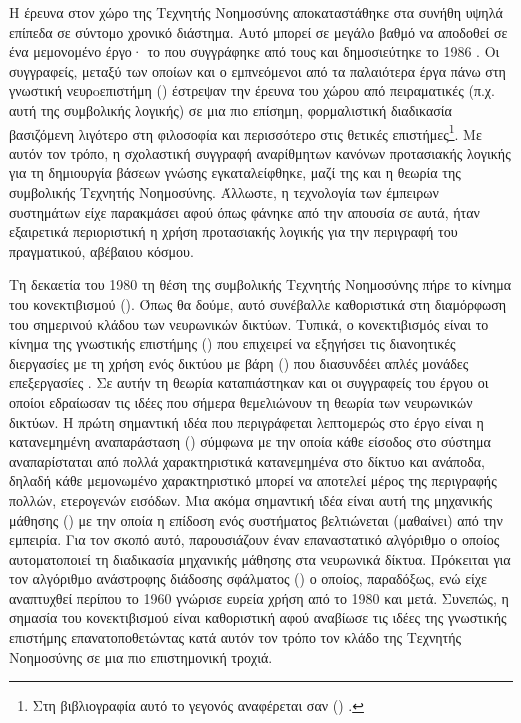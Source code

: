 Η έρευνα στον χώρο της Τεχνητής Νοημοσύνης αποκαταστάθηκε στα συνήθη υψηλά επίπεδα σε σύντομο χρονικό διάστημα. Αυτό μπορεί σε μεγάλο βαθμό να αποδοθεί σε ένα μεμονομένο έργο· το  που συγγράφηκε από τους  και δημοσιεύτηκε το 1986 \cite{rumelhart1988parallel}. Οι συγγραφείς, μεταξύ των οποίων και ο  εμπνεόμενοι από τα παλαιότερα έργα πάνω στη γνωστική νευρoεπιστήμη () έστρεψαν την έρευνα του χώρου από πειραματικές  (π.χ. αυτή της συμβολικής λογικής) σε μια πιο επίσημη, φορμαλιστική διαδικασία βασιζόμενη λιγότερο στη φιλοσοφία και περισσότερο στις θετικές επιστήμες\footnote{Στη βιβλιογραφία αυτό το γεγονός αναφέρεται σαν  () \cite{russell2020artificial}.}. Με αυτόν τον τρόπο, η σχολαστική συγγραφή αναρίθμητων κανόνων προτασιακής λογικής για τη δημιουργία βάσεων γνώσης εγκαταλείφθηκε, μαζί της και η θεωρία της συμβολικής Τεχνητής Νοημοσύνης. Άλλωστε, η τεχνολογία των έμπειρων συστημάτων είχε παρακμάσει αφού όπως φάνηκε από την απουσία  σε αυτά, ήταν εξαιρετικά περιοριστική η χρήση προτασιακής λογικής για την περιγραφή του πραγματικού, αβέβαιου κόσμου\cite{russell2020artificial, singh_2019}.
\par

Τη δεκαετία του 1980 τη θέση της συμβολικής Τεχνητής Νοημοσύνης πήρε το κίνημα του κονεκτιβισμού (). Όπως θα δούμε, αυτό συνέβαλλε καθοριστικά στη διαμόρφωση του σημερινού κλάδου των νευρωνικών δικτύων. Τυπικά, ο κονεκτιβισμός είναι το κίνημα της γνωστικής επιστήμης () που επιχειρεί να εξηγήσει τις διανοητικές διεργασίες με τη χρήση ενός δικτύου με βάρη () που διασυνδέει απλές μονάδες επεξεργασίες \cite{connectionism}. Σε αυτήν τη θεωρία καταπιάστηκαν και οι συγγραφείς του έργου  \cite{rumelhart1988parallel} οι οποίοι εδραίωσαν τις ιδέες που σήμερα θεμελιώνουν τη θεωρία των νευρωνικών δικτύων. Η πρώτη σημαντική ιδέα που περιγράφεται λεπτομερώς στο έργο είναι η κατανεμημένη αναπαράσταση () σύμφωνα με την οποία κάθε είσοδος στο σύστημα αναπαρίσταται από πολλά χαρακτηριστικά κατανεμημένα στο δίκτυο και ανάποδα, δηλαδή κάθε μεμονωμένο χαρακτηριστικό μπορεί να αποτελεί μέρος της περιγραφής πολλών, ετερογενών εισόδων. Μια ακόμα σημαντική ιδέα είναι αυτή της μηχανικής μάθησης () με την οποία η επίδοση ενός συστήματος βελτιώνεται (μαθαίνει) από την εμπειρία. Για τον σκοπό αυτό, παρουσιάζουν έναν επαναστατικό αλγόριθμο ο οποίος αυτοματοποιεί τη διαδικασία μηχανικής μάθησης στα νευρωνικά δίκτυα. Πρόκειται για τον αλγόριθμο ανάστροφης διάδοσης σφάλματος () ο οποίος, παραδόξως, ενώ είχε αναπτυχθεί περίπου το 1960 γνώρισε ευρεία χρήση από το 1980 και μετά. Συνεπώς, η σημασία του κονεκτιβισμού είναι καθοριστική αφού αναβίωσε τις ιδέες της γνωστικής επιστήμης επανατοποθετώντας κατά αυτόν τον τρόπο τον κλάδο της Τεχνητής Νοημοσύνης σε μια πιο επιστημονική τροχιά.
\par


